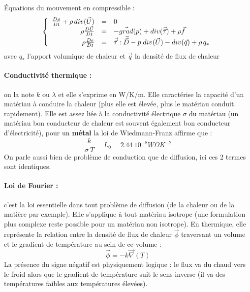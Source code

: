 
Équations du mouvement en compressible :
\[
\left\{
\begin{array}{r c l}
\frac{D\rho}{Dt}+\rho\,div(\vec{U}) &=& 0 \\
\rho\frac{D\vec{U}}{Dt} &=& -\vec{grad}(p)+div(\vec{\vec{\tau}})+\rho\vec{f} \\
\rho\frac{De}{Dt} &=& \vec{\vec{\tau}}:\vec{\vec{D}}-p.div(\vec{U})-div(\vec{q})+\rho\,q_*
\end{array}
\right.
\]
avec $q_*$ l'apport volumique de chaleur et $\vec{q}$ la densité de flux de chaleur


\paragraph{Conductivité thermique :}on la note $k$ ou $\lambda$ et elle s'exprime en W/K/m. Elle caractérise la capacité d'un matériau à conduire la chaleur (plus elle est élevée, plus le matériau conduit rapidement). Elle est assez liée à la conductivité électrique $\sigma$ du matériau (un matériau bon conducteur de chaleur est souvent également bon conducteur d'électricité), pour un \textbf{métal} la loi de Wiedmann-Franz\cite{battaglia2010introduction} affirme que :
%
\begin{equation}
\frac{k}{\sigma~T} = L_0 = 2.44~10^{-8} W\Omega K^{-2}
\end{equation}
%
On parle aussi bien de problème de conduction que de diffusion, ici ces 2 termes sont identiques.


\paragraph{Loi de Fourier :}c'est la loi essentielle dans tout problème de diffusion (de la chaleur ou de la matière par exemple). Elle s'applique à tout matériau isotrope (une formulation plus complexe reste possible pour un matériau non isotrope). En thermique, elle représente la relation entre la densité de flux de chaleur $\vec{\phi}$ traversant un volume et le gradient de température au sein de ce volume :
%
\begin{equation}
\vec{\phi} = - k \vec{\nabla}(T)
\label{eq:fourier}
\end{equation}
%
La présence du signe négatif est physiquement logique : le flux va du chaud vers le froid alors que le gradient de température suit le sens inverse (il va des températures faibles aux températures élevées).
%
\begin{center}
\end{center}


